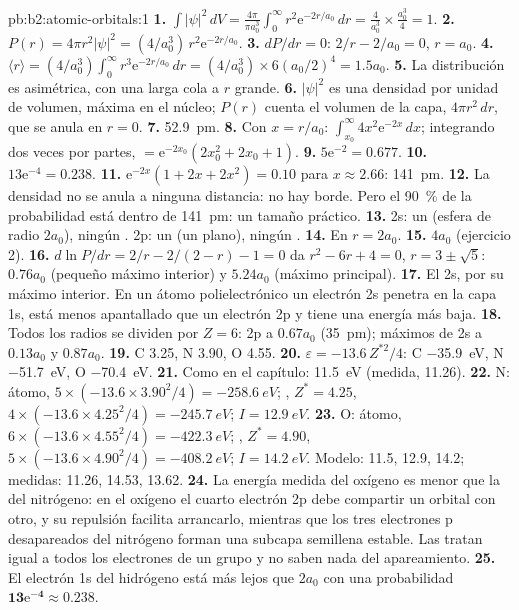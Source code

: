 \begin{solution}{pb:b2:atomic-orbitals:1}
\textbf{1.} $\int|\psi|^2\,dV = \frac{4\pi}{\pi a_0^3}\int_0^\infty r^2\mathrm e^{-2r/a_0}\,dr =
\frac{4}{a_0^3} \times \frac{a_0^3}{4} = 1$.
\textbf{2.} $P(r) = 4\pi r^2|\psi|^2 = (4/a_0^3)\,r^2\mathrm e^{-2r/a_0}$.
\textbf{3.} $dP/dr = 0$: $2/r - 2/a_0 = 0$, $r = a_0$.
\textbf{4.} $\langle r\rangle = (4/a_0^3)\int_0^\infty r^3\mathrm e^{-2r/a_0}\,dr = (4/a_0^3)
\times 6(a_0/2)^4 = 1.5a_0$.
\textbf{5.} La distribución es asimétrica, con una larga cola a $r$ grande.
\textbf{6.} $|\psi|^2$ es una densidad por unidad de volumen, máxima en el núcleo; $P(r)$
cuenta el volumen de la capa, $4\pi r^2\,dr$, que se anula en $r = 0$.
\textbf{7.} \qty{52.9}{pm}.
\textbf{8.} Con $x = r/a_0$: $\int_{x_0}^\infty 4x^2\mathrm e^{-2x}\,dx$; integrando dos veces por partes,
$= \mathrm e^{-2x_0}(2x_0^2 + 2x_0 + 1)$.
\textbf{9.} $5\mathrm e^{-2} = 0.677$.
\textbf{10.} $13\mathrm e^{-4} = 0.238$.
\textbf{11.} $\mathrm e^{-2x}(1 + 2x + 2x^2) = 0.10$ para $x \approx 2.66$: \qty{141}{pm}.
\textbf{12.} La densidad no se anula a ninguna distancia: no hay borde. Pero el 90~\% de la
probabilidad está dentro de \qty{141}{pm}: un tamaño práctico.
\textbf{13.} 2s: un  (esfera de radio $2a_0$), ningún . 2p: un
 (un plano), ningún .
\textbf{14.} En $r = 2a_0$.
\textbf{15.} $4a_0$ (ejercicio 2).
\textbf{16.} $d\ln P/dr = 2/r - 2/(2 - r) - 1 = 0$ da $r^2 - 6r + 4 = 0$, $r = 3 \pm \sqrt5$:
$0.76a_0$ (pequeño máximo interior) y $5.24a_0$ (máximo principal).
\textbf{17.} El 2s, por su máximo interior. En un átomo polielectrónico un electrón 2s
penetra en la capa 1s, está menos apantallado que un electrón 2p y tiene una energía
más baja.
\textbf{18.} Todos los radios se dividen por $Z = 6$: 2p a $0.67a_0$ (\qty{35}{pm}); máximos de 2s
a $0.13a_0$ y $0.87a_0$.
\textbf{19.} C 3.25, N 3.90, O 4.55.
\textbf{20.} $\varepsilon = -13.6\,Z^{*2}/4$: C \qty{-35.9}{eV}, N \qty{-51.7}{eV}, O
\qty{-70.4}{eV}.
\textbf{21.} Como en el capítulo: \qty{11.5}{eV} (medida, 11.26).
\textbf{22.} N: átomo, $5 \times (-13.6 \times 3.90^2/4) = \qty{-258.6}{eV}$; , $Z^* =
4.25$, $4 \times (-13.6 \times 4.25^2/4) = \qty{-245.7}{eV}$; $I = \qty{12.9}{eV}$.
\textbf{23.} O: átomo, $6 \times (-13.6 \times 4.55^2/4) = \qty{-422.3}{eV}$; , $Z^* =
4.90$, $5 \times (-13.6 \times 4.90^2/4) = \qty{-408.2}{eV}$; $I = \qty{14.2}{eV}$. Modelo:
11.5, 12.9, 14.2; medidas: 11.26, 14.53, 13.62.
\textbf{24.} La energía medida del oxígeno es menor que la del nitrógeno: en el
oxígeno el cuarto electrón 2p debe compartir un orbital con otro, y su
repulsión facilita arrancarlo, mientras que los tres electrones p desapareados del nitrógeno
forman una subcapa semillena estable. Las  tratan igual a todos los electrones de un grupo
y no saben nada del apareamiento.
\textbf{25.} El electrón 1s del hidrógeno está más lejos que $2a_0$ con una probabilidad
$\boldsymbol{13\mathrm e^{-4} \approx 0.238}$.
\end{solution}
